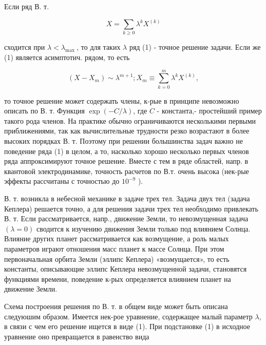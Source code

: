 \documentclass[10pt]{article}
\begin{document}
Если ряд В. т.



\[

X=\sum_{k \geqslant 0} \lambda^{k} X^{(k)}

\]



сходится при $\lambda<\lambda_{\text {max }}$, то для таких $\lambda$ ряд (1) - точное решение задачи. Если же (1) является асимптотич. рядом, то есть



\[

\left(X-X_{m}\right) \sim \lambda^{m+1} ; X_{m} \equiv \sum_{k=0}^{m} \lambda^{k} X^{(k)},

\]



то точное решение может содержать члены, к-рые в принципе невозможно описать по В. т. Функция $\exp (-C / \lambda)$, где $C$ - константа,- простейший пример такого рода членов. На практике обычно ограничиваются несколькими первыми приближениями, так как вычислительные трудности резко возрастают в более высоких порядках В. т. Поэтому при решении болышинства задач важно не поведение ряда (1) в целом, а то, насколько хорошо несколько первых членов ряда аппроксимируют точное решение. Вместе с тем в ряде областей, напр. в квантовой электродинамике, точность расчетов по В.т. очень высока (нек-рые эффекты рассчитаны с точностью до $10^{-9}$ ).



В. т. возникла в небесной механике в задаче трех тел. Задача двух тел (задача Кеплера) решается точно, а для решения задачи трех тел необходимо привлекать В. т. Если рассматривается, напр., движение Земли, то невозмущенная задача $(\lambda=0)$ сводится к изучению движения Земли только под влиянием Солнца. Влияние других планет рассматривается как возмущение, а роль малых параметров играют отношения масс планет к массе Солнца. При этом первоначальная орбита Земли (эллипс Кеплера) «возмущается», то есть константы, описывающие эллипс Кеплера невозмущенной задачи, становятся функциями времени, поведение к-рых определяется влиянием планет на движение Земли.



Схема построения решения по В. т. в общем виде может быть описана следуюшим образом. Имеется нек-рое уравнение, содержащее малый параметр $\lambda$, в связи с чем его решение ищется в виде (1). При подстановке (1) в исходное уравнение оно превращается в равенство вида
\end{document}

